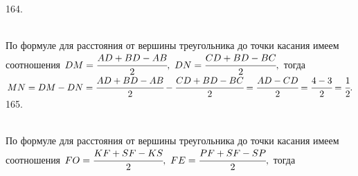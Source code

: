 \documentclass[12pt]{article}
\begin{document}
164. \begin{figure}[ht!]
\end{figure}\\
По формуле для расстояния от вершины треугольника до точки касания имеем соотношения $DM=\cfrac{AD+BD-AB}{2},\ DN=\cfrac{CD+BD-BC}{2},$ тогда\\
$MN=DM-DN=\cfrac{AD+BD-AB}{2}-\cfrac{CD+BD-BC}{2}=\cfrac{AD-CD}{2}=\cfrac{4-3}{2}=\cfrac{1}{2}.$\\
165. \begin{figure}[ht!]
\end{figure}\\
По формуле для расстояния от вершины треугольника до точки касания имеем соотношения $FO=\cfrac{KF+SF-KS}{2},\ FE=\cfrac{PF+SF-SP}{2},$ тогда\\
\end{document}
